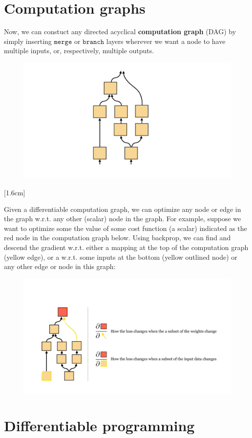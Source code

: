 \section{Computation graphs}
Now, we can constuct any directed acyclical \textbf{computation graph} (DAG) by simply inserting $\texttt{merge}$ or $\texttt{branch}$ layers wherever we want a node to have multiple inputs, or, respectively, multiple outputs.
\begin{figure}[h]
    \centering
    \includegraphics[width=0.16\linewidth]{./figures/backpropagation/DAG.pdf}
    \label{fig:backprop_DAG}
\end{figure}
[1.6cm]

Given a differentiable computation graph, we can optimize any node or edge in the graph w.r.t. any other (scalar) node in the graph. For example, suppose we want to optimize some the value of some cost function (a scalar) indicated as the red node in the computation graph below. Using backprop, we can find and descend the gradient w.r.t. either a mapping at the top of the computation graph (yellow edge), or a w.r.t. some inputs at the bottom (yellow outlined node) or any other edge or node in this graph:
\begin{figure}[h]
    \centering
    \includegraphics[width=0.9\linewidth]{./figures/backpropagation/computation_graph_opt.pdf}
    \label{fig:computation_graph_opt}
\end{figure}

\section{Differentiable programming}

